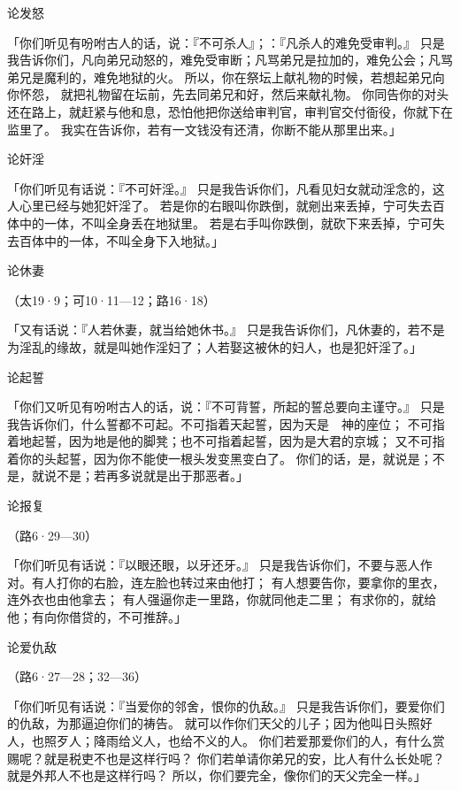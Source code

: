 {\par }{\SH 论发怒
\par }{\PP {}「你们听见有吩咐古人的话，说：『不可杀人』；{}：『凡杀人的难免受审判。』
只是我告诉你们，凡向弟兄动怒的，难免受审断；凡骂弟兄是拉加的，难免公会{}；凡骂弟兄是魔利的，难免地狱的火。
所以，你在祭坛上献礼物的时候，若想起弟兄向你怀怨，
就把礼物留在坛前，先去同弟兄和好，然后来献礼物。
你同告你的对头还在路上，就赶紧与他和息，恐怕他把你送给审判官，审判官交付衙役，你就下在监里了。
我实在告诉你，若有一文钱没有还清，你断不能从那里出来。」
\par }{\SH 论奸淫
\par }{\PP {}「你们听见有话说：『不可奸淫。』
只是我告诉你们，凡看见妇女就动淫念的，这人心里已经与她犯奸淫了。
若是你的右眼叫你跌倒，就剜出来丢掉，宁可失去百体中的一体，不叫全身丢在地狱里。
若是右手叫你跌倒，就砍下来丢掉，宁可失去百体中的一体，不叫全身下入地狱。」
\par }{\SH 论休妻
\par }{\R （太19·9；可10·11—12；路16·18）
\par }{\PP {}「又有话说：『人若休妻，就当给她休书。』
只是我告诉你们，凡休妻的，若不是为淫乱的缘故，就是叫她作淫妇了；人若娶这被休的妇人，也是犯奸淫了。」
\par }{\SH 论起誓
\par }{\PP {}「你们又听见有吩咐古人的话，说：『不可背誓，所起的誓总要向主谨守。』
只是我告诉你们，什么誓都不可起。不可指着天起誓，因为天是　神的座位；
不可指着地起誓，因为地是他的脚凳；也不可指着{}起誓，因为{}是大君的京城；
又不可指着你的头起誓，因为你不能使一根头发变黑变白了。
你们的话，是，就说是；不是，就说不是；若再多说就是出于那恶者。」
\par }{\SH 论报复
\par }{\R （路6·29—30）
\par }{\PP {}「你们听见有话说：『以眼还眼，以牙还牙。』
只是我告诉你们，不要与恶人作对。有人打你的右脸，连左脸也转过来由他打；
有人想要告你，要拿你的里衣，连外衣也由他拿去；
有人强逼你走一里路，你就同他走二里；
有求你的，就给他；有向你借贷的，不可推辞。」
\par }{\SH 论爱仇敌
\par }{\R （路6·27—28；32—36）
\par }{\PP {}「你们听见有话说：『当爱你的邻舍，恨你的仇敌。』
只是我告诉你们，要爱你们的仇敌，为那逼迫你们的祷告。
就可以作你们天父的儿子；因为他叫日头照好人，也照歹人；降雨给义人，也给不义的人。
你们若{}爱那爱你们的人，有什么赏赐呢？就是税吏不也是这样行吗？
你们若单请你弟兄的安，比人有什么长处呢？就是外邦人不也是这样行吗？
所以，你们要完全，像你们的天父完全一样。」

}
